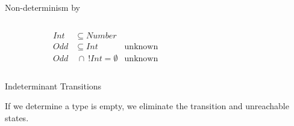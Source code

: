 
\begin{frame}{Non-determinism by }
  \begin{columns}
    \begin{column}{0.35\textwidth}
      \centering
      
      \begin{align*}
        Int&\subseteq Number\\
        Odd&\subseteq Int &\text{unknown}\\
        Odd&~\cap~ !Int = \emptyset &\text{unknown}
      \end{align*}
      \scalebox{0.8}{}
    \end{column}%
    \begin{column}{0.7\textwidth}
      \only<1>{\scalebox{0.6}{}}%
    \end{column}
  \end{columns}

\end{frame}








\newsavebox\classbox
\begin{lrbox}{\classbox}
  \begin{minipage}{5cm}
    
  \end{minipage}
\end{lrbox}

\begin{frame}{Indeterminant Transitions}

  \scalebox{0.8}{}

  If we determine a type is empty, we eliminate the
  transition and unreachable states.
\end{frame}


